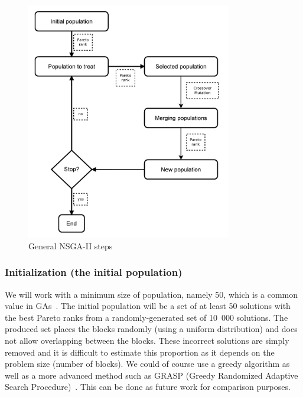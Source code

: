 \begin{figure}[h!]
\begin{center}
\includegraphics[width=0.8\textwidth]{GA_dia_en.pdf}
\end{center}
\vspace{-0.5cm}
\caption{General NSGA-II steps}
\begin{center}
\end{center}
\label{fig:ga_steps}
\end{figure}

\subsubsection{Initialization (the initial population)}
We will work with a minimum size of population, namely 50, which is a common value in GAs~\cite{Davis1989}. The initial population will be a set of at least 50 solutions with the best Pareto ranks from a randomly-generated set of 10~000 solutions. The produced set places the blocks randomly (using a uniform distribution) and does not allow overlapping between the blocks. These incorrect solutions are simply removed and it is difficult to estimate this proportion as it depends on the problem size (number of blocks). We could of course use a greedy algorithm as well as a more advanced method such as GRASP (Greedy Randomized Adaptive Search Procedure)~\cite{HarSho87a}. This can be done as future work for comparison purposes.

